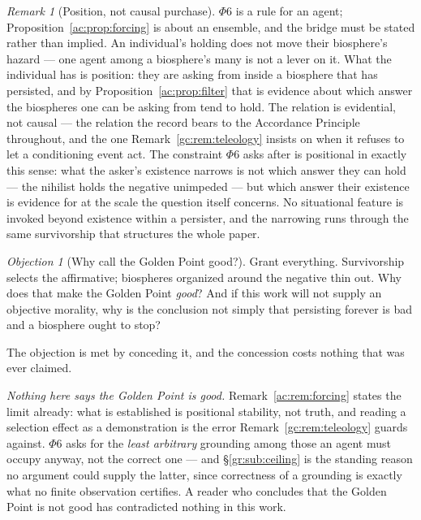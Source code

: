 \documentclass[11pt]{article}
\numberwithin{equation}{section}
\theoremstyle{plain}
\theoremstyle{definition}
\theoremstyle{remark}
\newtheorem{remark}[theorem]{Remark}
\newtheorem{objection}[theorem]{Objection}
\begin{document}
\begin{remark}[Position, not causal purchase]\label{ac:rem:bridge}
$\Phi6$ is a rule for an agent; Proposition~\ref{ac:prop:forcing} is about an ensemble, and the bridge must be stated rather than implied. An individual's holding does not move their biosphere's hazard --- one agent among a biosphere's many is not a lever on it. What the individual has is position: they are asking from inside a biosphere that has persisted, and by Proposition~\ref{ac:prop:filter} that is evidence about which answer the biospheres one can be asking from tend to hold. The relation is evidential, not causal --- the relation the record bears to the Accordance Principle throughout, and the one Remark~\ref{gc:rem:teleology} insists on when it refuses to let a conditioning event act. The constraint $\Phi6$ asks after is positional in exactly this sense: what the asker's existence narrows is not which answer they can hold --- the nihilist holds the negative unimpeded --- but which answer their existence is evidence for at the scale the question itself concerns. No situational feature is invoked beyond existence within a persister, and the narrowing runs through the same survivorship that structures the whole paper.
\end{remark}

\begin{objection}[Why call the Golden Point good?]\label{ac:obj:good}
Grant everything. Survivorship selects the affirmative; biospheres
organized around the negative thin out. Why does that make the Golden
Point \emph{good}? And if this work will not supply an objective
morality, why is the conclusion not simply that persisting forever is bad
and a biosphere ought to stop?
\end{objection}

\noindent The objection is met by conceding it, and the concession costs
nothing that was ever claimed.

\emph{Nothing here says the Golden Point is good.}
Remark~\ref{ac:rem:forcing} states the limit already: what is
established is positional stability, not truth, and reading a selection
effect as a demonstration is the error Remark~\ref{gc:rem:teleology} guards
against. $\Phi6$ asks for the \emph{least arbitrary} grounding among
those an agent must occupy anyway, not the correct one --- and
\S\ref{gr:sub:ceiling} is the standing reason no argument could supply
the latter, since correctness of a grounding is exactly what no finite
observation certifies. A reader who concludes that the Golden Point is
not good has contradicted nothing in this work.
\end{document}
